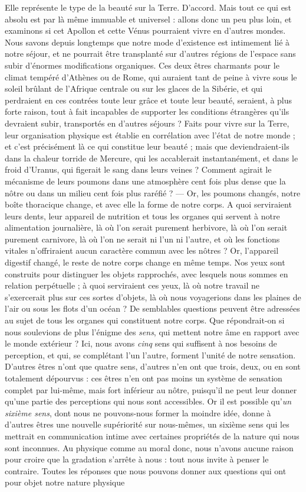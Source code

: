 \documentclass[a4paper, 11pt, oneside]{article}
\begin{document}
Elle représente le type de la beauté sur la Terre. D'accord. Mais tout ce qui est absolu est par là même immuable et universel : allons donc un peu plus loin, et examinons si cet Apollon et cette Vénus pourraient vivre en d'autres mondes. Nous savons depuis longtemps que notre mode d'existence est intimement lié à notre séjour, et ne pourrait être transplanté sur d'autres régions de l'espace sans subir d'énormes modifications organiques. Ces deux êtres charmants pour le climat tempéré d'Athènes ou de Rome, qui auraient tant de peine à vivre sous le soleil brûlant de l'Afrique centrale ou sur les glaces de la Sibérie, et qui perdraient en ces contrées toute leur grâce et toute leur beauté, seraient, à plus forte raison, tout à fait incapables de supporter les conditions étrangères qu'ils devraient subir, transportés en d'autres séjours ? Faits pour vivre sur la Terre, leur organisation physique est établie en corrélation avec l'état de notre monde ; et c'est précisément là ce qui constitue leur beauté ; mais que deviendraient-ils dans la chaleur torride de Mercure, qui les accablerait instantanément, et dans le froid d'Uranus, qui figerait le sang dans leurs veines ? Comment agirait le mécanisme de leurs poumons dans une atmosphère cent fois plus dense que la nôtre ou dans un milieu cent fois plus raréfié ? --- Or, les poumons changés, notre boîte thoracique change, et avec elle la forme de notre corps. A quoi serviraient leurs dents, leur appareil de nutrition et tous les organes qui servent à notre alimentation journalière, là où l'on serait purement herbivore, là où l'on serait purement carnivore, là où l'on ne serait ni l'un ni l'autre, et où les fonctions vitales n'offriraient aucun caractère commun avec les nôtres ? Or, l'appareil digestif changé, le reste de notre corps change en même temps. Nos yeux sont construits pour distinguer les objets rapprochés, avec lesquels nous sommes en relation perpétuelle ; à quoi serviraient ces yeux, là où notre travail ne s'exercerait plus sur ces sortes d'objets, là où nous voyagerions dans les plaines de l'air ou sous les flots d'un océan ? De semblables questions peuvent être adressées au sujet de tous les organes qui constituent notre corps. Que répondrait-on si nous soulevions de plus l'énigme des \emph{sens}, qui mettent notre âme en rapport avec le monde extérieur ? Ici, nous avons \emph{cinq} sens qui suffisent à nos besoins de perception, et qui, se complétant l'un l'autre, forment l'unité de notre sensation. D'autres êtres n'ont que quatre sens, d'autres n'en ont que trois, deux, ou en sont totalement dépourvus : ces êtres n'en ont pas moins un système de sensation complet par lui-même, mais fort inférieur au nôtre, puisqu'il ne peut leur donner qu'une partie des perceptions qui nous sont accessibles. Or il est possible qu'\emph{un sixième sens}, dont nous ne pouvons-nous former la moindre idée, donne à d'autres êtres une nouvelle supériorité sur nous-mêmes, un sixième sens qui les mettrait en communication intime avec certaines propriétés de la nature qui nous sont inconnues. Au physique comme au moral donc, nous n'avons aucune raison pour croire que la gradation s'arrête à nous : tout nous invite à penser le contraire. Toutes les réponses que nous pouvons donner aux questions qui ont pour objet notre nature physique 
\end{document}
